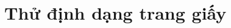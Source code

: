 \documentclass{../../tkthesis}
\begin{document}
\tableofcontents
\chapter{Thử định dạng trang giấy}
\lipsum[2-5]
\end{document}
